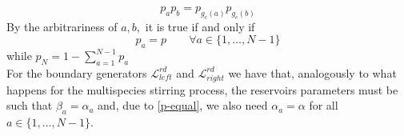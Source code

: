 \documentclass[10pt]{article}
\numberwithin{equation}{section}
\numberwithin{equation}{subsection}
\begin{document}
\begin{comment}
\begin{equation}
	\begin{split}
		&n_{a}^{x}n_{b}^{x+1}\frac{\nu!}{n_{1}^{x}!\cdots n_{a}^{x}!\cdots n_{g_{c}(b)}^{x}!\ldots n_{N}^{x}!}\frac{\nu!}{n_{1}^{x+1}!\cdots n_{b}^{x+1}!\cdots n_{g_{c}(a)}^{x+1}!\ldots n_{N}^{x+1}!}\\&\rho_{1}^{n_{1}^{x}+n_{1}^{x+1}}\cdots \rho_{a}^{n_{a}^{x}}\cdots\rho_{g_{c}(b)}^{n_{g_{c}(b)}^{x}}\cdots\rho_{b}^{n_{b}^{x+1}}\cdots \rho_{g_{c}(a)}^{n_{g_{c}(a)}^{x+1}}\cdots \rho_{N}^{n_{N}^{x}+n_{N}^{x+1}}
		\\
		=&(n_{g_{c}(b)}^{x}+1)(n_{g_{c}(a)}^{x+1}+1)\frac{\nu!}{n_{1}^{x}!\cdots (n_{a}^{x}-1)!\cdots (n_{g_{c}(b)}^{x}+1)!\ldots n_{N}^{x}!}\frac{\nu!}{n_{1}^{x+1}!\cdots (n_{b}^{x+1}-1)!\cdots (n_{g_{c}(a)}^{x+1}+1)!\ldots n_{N}^{x+1}!}
		\\&
		\rho_{1}^{n_{1}^{x}+n_{1}^{x+1}}\ldots \rho_{a}^{n_{a}^{x}-1}\cdots\rho_{g_{c}(b)}^{n_{g_{c}(b)}^{x}+1}\cdots\rho_{b}^{n_{b}^{x+1}-1}\cdots \rho_{g_{c}(a)}^{n_{g_{c}(a)}^{x+1}+1}
	\end{split}
\end{equation}
that simplifies to 
\end{comment}
\begin{equation}
	p_{a}p_{b}=p_{g_{c}(a)}p_{g_{c}(b)}
\end{equation}
By the arbitrariness of $a,b,$ it is true if and only if
\begin{equation}\label{p-equal}
	p_{a}=p\qquad \forall a\in \{1,\ldots,N-1\}
\end{equation}
while $p_{N}=1-\sum_{a=1}^{N-1}p_{a}$\\
For the boundary generators $\mathcal{L}_{left}^{rd}$ and $\mathcal{L}_{right}^{rd}$ we have that, analogously to what happens for the multispecies stirring process, the reservoirs parameters must be such that $\beta_{a}=\alpha_{a}$ and, due to \eqref{p-equal}, we also need $\alpha_{a}=\alpha$ for all $a\in\{1,\ldots,N-1\}$. 
\end{document}

